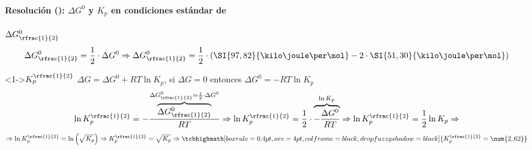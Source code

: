 \begin{frame}
	\frametitle{\ejerciciocmd}
	\framesubtitle{Resolución (): $\Delta G^0$ y $K_p$ en condiciones estándar de }
	\begin{block}{$\Delta G^0_{\rfrac{1}{2}}$}
		$$
			\Delta G^0_{\rfrac{1}{2}} = \frac{1}{2}\cdot\Delta G^0\Rightarrow\Delta G^0_{\rfrac{1}{2}} = \frac{1}{2}\cdot\left(\SI{97,82}{\kilo\joule\per\mol}-2\cdot\SI{51,30}{\kilo\joule\per\mol}\right)
		$$
		\centering{}
		\centering\myovalbox{\textcolor{yellow}{Espontánea}}
	\end{block}
	\begin{alertblock}<1->{$K_p^{\rfrac{1}{2}}$}
		 $\Delta G = \Delta G^0 + RT\ln{K_p}$, si $\Delta G=0$ entonces $\Delta G^0= -RT\ln{K_p}$
		$$
			\ln K_p^{\rfrac{1}{2}} = -\frac{\overbrace{\Delta G^0_{\rfrac{1}{2}}}^{\Delta G^0_{\rfrac{1}{2}}=\frac{1}{2}\cdot\Delta G^0}}{RT}\Rightarrow
			\ln K_p^{\rfrac{1}{2}} = \frac{1}{2}\cdot\overbrace{-\frac{\Delta G^0}{RT}}^{\ln K_p}\Rightarrow
			\ln K_p^{\rfrac{1}{2}} = \frac{1}{2}\ln K_p\Rightarrow
		$$
		$$
			\Rightarrow\ln K_p^{\rfrac{1}{2}} = \ln\left(\sqrt{K_p}\right)\Rightarrow
			K_p^{\rfrac{1}{2}} = \sqrt{K_p}\Rightarrow
			\tcbhighmath[boxrule=0.4pt,arc=4pt,colframe=black,drop fuzzy shadow=black]{K_p^{\rfrac{1}{2}}=\num{2,62}}
		$$
		\centering\myovalbox{\textcolor{yellow}{Reacción favorecida hacia productos}}
	\end{alertblock}
\end{frame}
